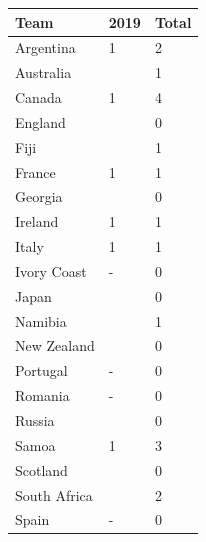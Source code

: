 \documentclass{article}
\begin{document}
\begin{tabular}{lll}
\toprule
Team & 2019 & Total \\
\midrule
Argentina & 1 & 2 \\
Australia &  & 1 \\
Canada & 1 & 4 \\
England &  & 0 \\
Fiji &  & 1 \\
France & 1 & 1 \\
Georgia &  & 0 \\
Ireland & 1 & 1 \\
Italy & 1 & 1 \\
Ivory Coast & - & 0 \\
Japan &  & 0 \\
Namibia &  & 1 \\
New Zealand &  & 0 \\
Portugal & - & 0 \\
Romania & - & 0 \\
Russia &  & 0 \\
Samoa & 1 & 3 \\
Scotland &  & 0 \\
South Africa &  & 2 \\
Spain & - & 0 \\
\bottomrule
\end{tabular}
\end{document}
